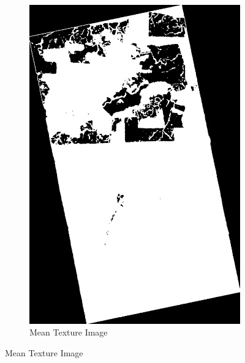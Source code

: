 \begin{figure}[H]
\begin{subfigure}[b]{0.4\linewidth}
      \includegraphics[width=\linewidth]{Cap3-Results/sum_and_diff_textures/meanimage.png}
       \caption{Mean Texture Image}
    \end{subfigure}
  \end{figure}
  \newpage
